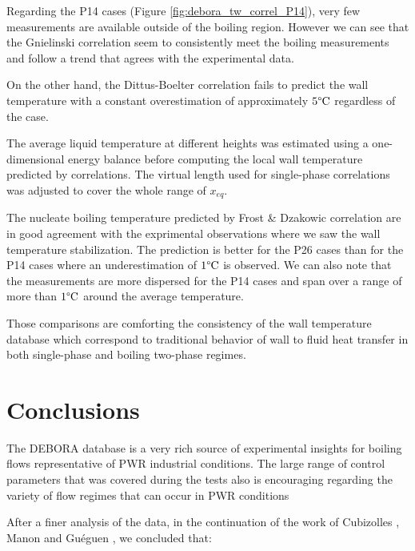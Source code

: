 \npar
Regarding the P14 cases (Figure \ref{fig:debora_tw_correl_P14}), very few measurements are available outside of the boiling region. However we can see that the Gnielinski correlation seem to consistently meet the boiling measurements and follow a trend that agrees with the experimental data.

\npar
On the other hand, the Dittus-Boelter correlation fails to predict the wall temperature with a constant overestimation of approximately $5\degree\mathrm{C}$ regardless of the case. 


\begin{note*}{}
The average liquid temperature at different heights was estimated using a one-dimensional energy balance before computing the local wall temperature predicted by correlations. The virtual length used for single-phase correlations was adjusted to cover the whole range of $x_{eq}$.
\end{note*}

\npar

The nucleate boiling temperature predicted by Frost \& Dzakowic correlation are in good agreement with the exprimental observations where we saw the wall temperature stabilization. The prediction is better for the P26 cases than for the P14 cases where an underestimation of $1\degree\mathrm{C}$ is observed. We can also note that the measurements are more dispersed for the P14 cases and span over a range of more than $1\degree\mathrm{C}$ around the average temperature.

\npar

Those comparisons are comforting the consistency of the wall temperature database which correspond to traditional behavior of wall to fluid heat transfer in both single-phase and boiling two-phase regimes.


\section{Conclusions}

The DEBORA database is a very rich source of experimental insights for boiling flows representative of PWR industrial conditions. The large range of control parameters that was covered during the tests also is encouraging regarding the variety of flow regimes that can occur in PWR conditions

\npar

After a finer analysis of the data, in the continuation of the work of Cubizolles \cite{cubizolles_etude_1996}, Manon \cite{manon_contribution_2000} and Guéguen \cite{gueguen_contribution_2013}, we concluded that:

